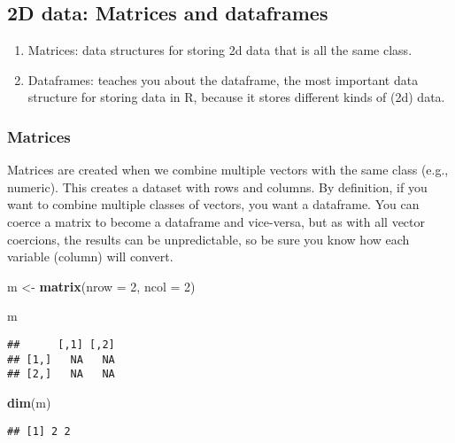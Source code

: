 \documentclass[
]{book}
\newenvironment{Shaded}{\begin{snugshade}}{\end{snugshade}}
\newcommand{\DataTypeTok}[1]{\textcolor[rgb]{0.13,0.29,0.53}{#1}}
\newcommand{\DecValTok}[1]{\textcolor[rgb]{0.00,0.00,0.81}{#1}}
\newcommand{\KeywordTok}[1]{\textcolor[rgb]{0.13,0.29,0.53}{\textbf{#1}}}
\newcommand{\NormalTok}[1]{#1}
\newcommand{\StringTok}[1]{\textcolor[rgb]{0.31,0.60,0.02}{#1}}
\providecommand{\tightlist}{%
  \setlength{\itemsep}{0pt}\setlength{\parskip}{0pt}}
\begin{document}
\hypertarget{d-data-matrices-and-dataframes}{%
\subsection{2D data: Matrices and dataframes}\label{d-data-matrices-and-dataframes}}

\begin{enumerate}
\def\labelenumi{\arabic{enumi}.}
\tightlist
\item
  Matrices: data structures for storing 2d data that is all the same class.
\item
  Dataframes: teaches you about the dataframe, the most important data structure for storing data in R, because it stores different kinds of (2d) data.
\end{enumerate}

\hypertarget{matrices}{%
\subsubsection{Matrices}\label{matrices}}

Matrices are created when we combine multiple vectors with the same class (e.g., numeric). This creates a dataset with rows and columns. By definition, if you want to combine multiple classes of vectors, you want a dataframe. You can coerce a matrix to become a dataframe and vice-versa, but as with all vector coercions, the results can be unpredictable, so be sure you know how each variable (column) will convert.

\begin{Shaded}
\begin{Highlighting}[]
\NormalTok{m \textless{}{-}}\StringTok{ }\KeywordTok{matrix}\NormalTok{(}\DataTypeTok{nrow =} \DecValTok{2}\NormalTok{, }\DataTypeTok{ncol =} \DecValTok{2}\NormalTok{)}

\NormalTok{m}
\end{Highlighting}
\end{Shaded}

\begin{verbatim}
##      [,1] [,2]
## [1,]   NA   NA
## [2,]   NA   NA
\end{verbatim}

\begin{Shaded}
\begin{Highlighting}[]
\KeywordTok{dim}\NormalTok{(m)}
\end{Highlighting}
\end{Shaded}

\begin{verbatim}
## [1] 2 2
\end{verbatim}
\end{document}
